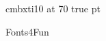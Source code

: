 \magnification{}
\parindent=0pt
\nopagenumbers

\font\cmbxti cmbxti10 at 70 true pt

{\cmbxti Fonts4Fun}


\bye
